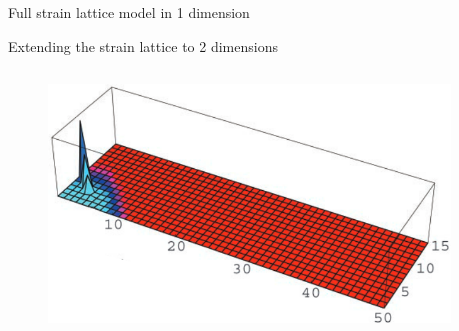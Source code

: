 \documentclass{beamer}
\begin{document}
\begin{frame}{Full strain lattice model in 1 dimension}
    \begin{figure}
        \centering
        \scalebox{0.8}{
        
        }
    \end{figure}
\end{frame}

\begin{frame}{Extending the strain lattice to 2 dimensions}
    \begin{columns}
        \begin{column}{0.5\textwidth}
            \begin{figure}
                \includegraphics[width=\textwidth]{gog_2d_fig/gog_2d_a_1.png}
            \end{figure}        
        \end{column}
        \begin{column}{0.5\textwidth}
        \end{column}
    \end{columns}
    \centering
    \vfill
    \tiny{\cite{gogDynamicsSelectionManystrain2002}}

\end{frame}
\end{document}
